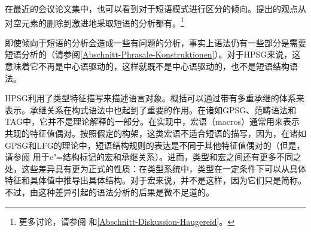 在最近的会议论文集中，也可以看到对于短语模式进行区分的倾向。提出的观点从对空元素的删除到激进地采取短语的分析都有。\footnote{%
更多讨论，请参阅 和\ref{Abschnitt-Diskussion-Haugereid}。
}

即使倾向于短语的分析会造成一些有问题的分析，事实上语法仍有一些部分是需要短语分析的（请参阅\ref{Abschnitt-Phrasale-Konstruktionen}）。对于HPSG来说，这意味着它不再是中心语驱动的，这样就既不是中心语驱动的，也不是短语结构语法。

HPSG利用了类型特征描写来描述语言对象。概括可以通过带有多重承继的体系来表示。承继关系在构式语法\indexcxgc 中也起到了重要的作用。在诸如GPSG\indexgpsgc、范畴语法\indexcgc  和TAG\indextagc 中，它并不是理论解释的一部分。在实现中，宏语（macros）通常用来表示共现的特征值偶对\citep*{DKK2004a}。按照假定的构架，这类宏语不适合短语的描写，因为，在诸如GPSG\indexgpsgc 和LFG\indexlfgc 的理论中，短语结构规则的表达是不同于其他特征值偶对的（但是，请参阅 用于c"=结构标记的宏和承继关系）。进而，类型和宏之间还有更多不同之处，这些差异具有更为正式的性质：在类型系统中，类型在一定条件下可以从具体特征和具体值中推导出具体结构。对于宏来说，并不是这样，因为它们只是简称。不过，由这种差异引起的语法分析的后果是微不足道的。

